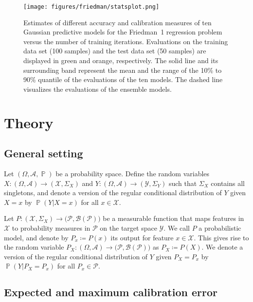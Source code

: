\documentclass{article}
\DeclareMathOperator{\Prob}{\mathbb{P}}
\begin{document}
\begin{figure}[htp]
    \begin{center}
        \texttt{[image: figures/friedman/statsplot.png]}
        \caption{Estimates of different accuracy and calibration measures of ten
        Gaussian predictive models for the Friedman~1 regression problem versus
        the number of training iterations.
        Evaluations on the training data set (100 samples) and the test data set
        (50 samples) are displayed in green and orange, respectively. The solid line
        and its surrounding band represent the mean and the range of the 10\% to 90\%
        quantile of the evaluations of the ten models. The dashed line visualizes the
        evaluations of the ensemble models.}
        \label{fig:friedman1}
    \end{center}
\end{figure}

\section{Theory}
\label{app:theory}

\subsection{General setting}

Let $(\Omega, \mathcal{A}, \Prob)$ be a probability space. Define the random
variables $X \colon (\Omega, \mathcal{A}) \to (\mathcal{X}, \Sigma_X)$
and $Y \colon (\Omega, \mathcal{A}) \to (\mathcal{Y}, \Sigma_Y)$
such that $\Sigma_X$ contains all singletons, and denote a version of the regular
conditional distribution of $Y$ given $X = x$ by $\Prob(Y|X = x)$ for all
$x \in \mathcal{X}$.

Let $P \colon (\mathcal{X}, \Sigma_X) \to \big(\mathcal{P}, \mathcal{B}(\mathcal{P})\big)$
be a measurable function that maps features in $\mathcal{X}$ to
probability measures in $\mathcal{P}$ on the target space $\mathcal{Y}$.
We call $P$ a probabilistic model, and denote by $P_x \coloneqq P(x)$ its
output for feature $x \in \mathcal{X}$. This gives rise to the random
variable $P_X \colon (\Omega, \mathcal{A}) \to \big(\mathcal{P}, \mathcal{B}(\mathcal{P})\big)$
as $P_X \coloneqq P(X)$. We denote a version of the regular conditional distribution
of $Y$ given $P_X = P_x$ by $\Prob(Y| P_X = P_x)$ for all $P_x \in \mathcal{P}$.

\subsection{Expected and maximum calibration error}
\label{app:ece_mce}
\end{document}
